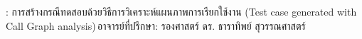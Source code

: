 \begin{abstractquote}
\studentname : การสร้างกรณีทดสอบด้วยวิธีการวิเคราะห์แผนภาพการเรียกใช้งาน (Test case generated with Call Graph analysis)\,อาจารย์ที่ปรึกษา: รองศาสตร์ ดร. ธาราทิพย์ สุวรรณศาสตร์
\end{abstractquote}

